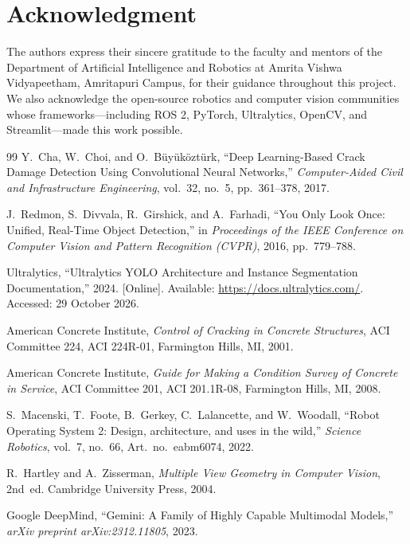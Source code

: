 \documentclass[12pt,a4paper,oneside]{report}
\begin{document}
\chapter*{Acknowledgment}
The authors express their sincere gratitude to the faculty and mentors of the Department of Artificial Intelligence and Robotics at Amrita Vishwa Vidyapeetham, Amritapuri Campus, for their guidance throughout this project. We also acknowledge the open-source robotics and computer vision communities whose frameworks---including ROS 2, PyTorch, Ultralytics, OpenCV, and Streamlit---made this work possible.


\begin{thebibliography}{99}
Y.~Cha, W.~Choi, and O.~B{\"u}y{\"u}k{\"o}zt{\"u}rk, ``Deep Learning-Based Crack Damage Detection Using Convolutional Neural Networks,'' \emph{Computer-Aided Civil and Infrastructure Engineering}, vol.~32, no.~5, pp.~361--378, 2017.

J.~Redmon, S.~Divvala, R.~Girshick, and A.~Farhadi, ``You Only Look Once: Unified, Real-Time Object Detection,'' in \emph{Proceedings of the IEEE Conference on Computer Vision and Pattern Recognition (CVPR)}, 2016, pp.~779--788.

Ultralytics, ``Ultralytics YOLO Architecture and Instance Segmentation Documentation,'' 2024. [Online]. Available: \url{https://docs.ultralytics.com/}. Accessed: 29 October 2026.

American Concrete Institute, \emph{Control of Cracking in Concrete Structures}, ACI Committee 224, ACI 224R-01, Farmington Hills, MI, 2001.

American Concrete Institute, \emph{Guide for Making a Condition Survey of Concrete in Service}, ACI Committee 201, ACI 201.1R-08, Farmington Hills, MI, 2008.

S.~Macenski, T.~Foote, B.~Gerkey, C.~Lalancette, and W.~Woodall, ``Robot Operating System 2: Design, architecture, and uses in the wild,'' \emph{Science Robotics}, vol.~7, no.~66, Art.~no.~eabm6074, 2022.

R.~Hartley and A.~Zisserman, \emph{Multiple View Geometry in Computer Vision}, 2nd~ed. Cambridge University Press, 2004.

Google DeepMind, ``Gemini: A Family of Highly Capable Multimodal Models,'' \emph{arXiv preprint arXiv:2312.11805}, 2023.
\end{thebibliography}
\end{document}
